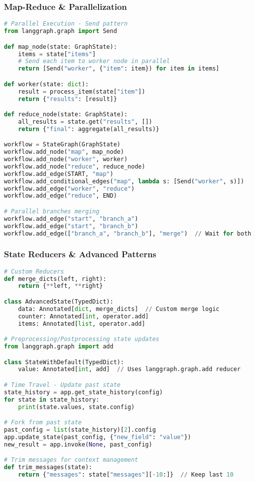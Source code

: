 \begin{frame}[fragile]\frametitle{Map-Reduce \& Parallelization}
      \begin{lstlisting}[language=python,basicstyle=\tiny]
# Parallel Execution - Send pattern
from langgraph.graph import Send

def map_node(state: GraphState):
    items = state["items"]
    # Send each item to worker node in parallel
    return [Send("worker", {"item": item}) for item in items]

def worker(state: dict):
    result = process_item(state["item"])
    return {"results": [result]}

def reduce_node(state: GraphState):
    all_results = state.get("results", [])
    return {"final": aggregate(all_results)}

workflow = StateGraph(GraphState)
workflow.add_node("map", map_node)
workflow.add_node("worker", worker)
workflow.add_node("reduce", reduce_node)
workflow.add_edge(START, "map")
workflow.add_conditional_edges("map", lambda s: [Send("worker", s)])
workflow.add_edge("worker", "reduce")
workflow.add_edge("reduce", END)

# Parallel branches merging
workflow.add_edge("start", "branch_a")
workflow.add_edge("start", "branch_b")
workflow.add_edge(["branch_a", "branch_b"], "merge")  // Wait for both
  \end{lstlisting}
\end{frame}

\begin{frame}[fragile]\frametitle{State Reducers \& Advanced Patterns}
      \begin{lstlisting}[language=python,basicstyle=\tiny]
# Custom Reducers
def merge_dicts(left, right):
    return {**left, **right}

class AdvancedState(TypedDict):
    data: Annotated[dict, merge_dicts]  // Custom merge logic
    counter: Annotated[int, operator.add]
    items: Annotated[list, operator.add]

# Preprocessing/Postprocessing state updates
from langgraph.graph import add

class StateWithDefault(TypedDict):
    value: Annotated[int, add]  // Uses langgraph.graph.add reducer

# Time Travel - Update past state
state_history = app.get_state_history(config)
for state in state_history:
    print(state.values, state.config)

# Fork from past state
past_config = list(state_history)[2].config
app.update_state(past_config, {"new_field": "value"})
new_result = app.invoke(None, past_config)

# Trim messages for context management
def trim_messages(state):
    return {"messages": state["messages"][-10:]}  // Keep last 10
  \end{lstlisting}
\end{frame}

